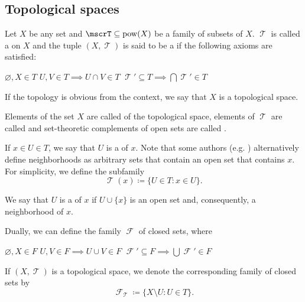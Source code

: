 \subsection{Topological spaces}\label{subsec:topological_spaces}

\begin{definition}\label{def:topological_space}
  Let \( X \) be any set and \( \mscrT \subseteq \pow(X) \) be a family of subsets of \( X \). \( \mscrT \) is called a  on \( X \) and the tuple \( (X, \mscrT) \) is said to be a  if the following axioms are satisfied:
  \begin{thmenum}
     \( \varnothing, X \in T \)
     \( U, V \in T \implies U \cap V \in T \)
     \( \mscrT' \subseteq T \implies \bigcap \mscrT' \in T \)
  \end{thmenum}

  If the topology is obvious from the context, we say that \( X \) is a topological space.

  Elements of the set \( X \) are called  of the topological space, elements of \( \mscrT \) are called  and set-theoretic complements of open sets are called .

  If \( x \in U \in T \), we say that \( U \) is a  of \( x \). Note that some authors (e.g. \cite[38]{Kelley1955}) alternatively define neighborhoods as arbitrary sets that contain an open set that contains \( x \). For simplicity, we define the subfamily
  \begin{equation*}
    \mscrT(x) \coloneqq \{ U \in T \colon x \in U \}.
  \end{equation*}

  We say that \( U \) is a  of \( x \) if \( U \cup \{ x \} \) is an open set and, consequently, a neighborhood of \( x \).

  Dually, we can define the family \( \mscrF \) of closed sets, where
  \begin{thmenum}
     \( \varnothing, X \in F \)
     \( U, V \in F \implies U \cup V \in F \)
     \( \mscrF' \subseteq F \implies \bigcup \mscrF' \in F \)
  \end{thmenum}

  If \( (X, \mscrT) \) is a topological space, we denote the corresponding family of closed sets by
  \begin{equation*}
    \mscrF_\mscrT \coloneqq \{ X \setminus U \colon U \in T \}.
  \end{equation*}
\end{definition}


